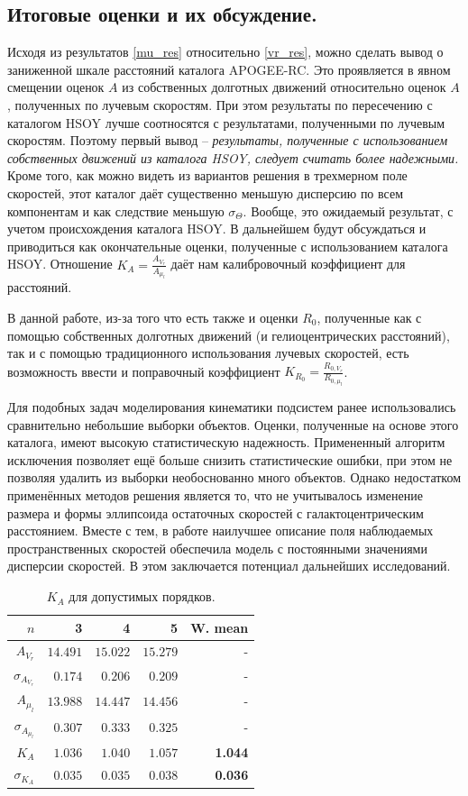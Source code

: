 \documentclass{matmex-diploma-custom}
\begin{document}
\subsection{Итоговые оценки и их обсуждение.}
Исходя из результатов \ref{mu_res} относительно \ref{vr_res}, можно сделать вывод о заниженной шкале расстояний каталога APOGEE-RC. Это проявляется в явном смещении оценок $A$ из собственных долготных движений относительно оценок $A$, полученных по лучевым скоростям. При этом результаты по пересечению с каталогом HSOY лучше соотносятся с результатами, полученными по лучевым скоростям. Поэтому первый вывод -- \textit{результаты, полученные с использованием собственных движений из каталога HSOY, следует считать более надежными.} Кроме того, как можно видеть из вариантов решения в трехмерном поле скоростей, этот каталог даёт существенно меньшую дисперсию по всем компонентам и как следствие меньшую $\sigma_{\Theta}$. Вообще, это ожидаемый результат, с учетом происхождения каталога HSOY. В дальнейшем будут обсуждаться и приводиться как окончательные оценки, полученные с использованием каталога HSOY. Отношение $K_A = \frac{A_{V_r}}{A_{\mu_l}}$ даёт нам калибровочный коэффициент для расстояний. 
\par В данной работе, из-за того что есть также и оценки $R_0$, полученные как с помощью собственных долготных движений (и гелиоцентрических расстояний), так и с помощью традиционного использования лучевых скоростей, есть возможность ввести и поправочный коэффициент $K_{R_0} = \frac{R_{0, V_r}}{R_{0, \mu_l}}$. 

\par Для подобных задач моделирования кинематики подсистем ранее использовались сравнительно небольшие выборки объектов. Оценки, полученные на основе этого каталога, имеют высокую статистическую надежность. Примененный алгоритм исключения позволяет ещё больше снизить статистические ошибки, при этом не позволяя удалить из выборки необоснованно много объектов.  Однако недостатком применённых методов решения является то, что не учитывалось изменение размера и формы эллипсоида остаточных скоростей с галактоцентрическим расстоянием. Вместе с тем, в работе \cite{Rastorguev} наилучшее описание поля наблюдаемых пространственных скоростей обеспечила модель с постоянными значениями дисперсии скоростей. В этом заключается потенциал дальнейших исследований.
\begin{table}[h!!] 
\centering
\caption{$K_A$ для допустимых порядков.}
\begin{tabular}{r|rrr|r}
        $ n$ & 3 & 4 & 5 & W. mean\\
\hline
\hline
$A_{V_r} $& $14.491     $&  $  15.022$ & $ 15.279 $ & -\\
$\sigma_{A_{V_r}}$& $0.174 $    &  $0.206 $& $  0.209  $& -\\
$A_{\mu_l} $& $13.988 $    & $ 14.447$ & $14.456 $ & -\\
$\sigma_{A_{\mu_l}}$& $0.307 $    & $0.333 $& $0.325 $ & -\\
\hline
$K_A$& $1.036 $    &   $1.040 $& $ 1.057 $ & \textbf{1.044}\\
$ \sigma_{K_A}$& $0.035 $    & $0.035 $&  $0.038 $ & \textbf{0.036}
\end{tabular}
\end{table}
\end{document}

